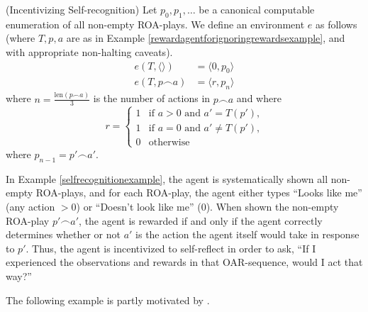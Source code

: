 \documentclass[runningheads]{llncs}
\begin{document}
\begin{example}
\label{selfrecognitionexample}
    (Incentivizing Self-recognition)
    Let $p_0,p_1,\ldots$ be a canonical computable enumeration of all non-empty ROA-plays.
    We define an environment $e$ as follows (where $T,p,a$
    are as in Example \ref{rewardagentforignoringrewardsexample}, and with appropriate
    non-halting caveats).
    \begin{align*}
        e(T,\langle\rangle) &= \langle 0, p_0\rangle\\
        e(T,p\frown a) &= \langle r, p_{n}\rangle
    \end{align*}
    where $n=\frac{\mbox{len}(p\frown a)}{3}$ is the number of actions in $p\frown a$ and where
    \[
        r =
        \begin{cases}
            1 &\mbox{if $a>0$ and $a'=T(p')$,}\\
            1 &\mbox{if $a=0$ and $a'\not=T(p')$,}\\
            0 &\mbox{otherwise}
        \end{cases}
    \]
    where $p_{n-1}=p'\frown a'$.
\end{example}

In Example \ref{selfrecognitionexample}, the agent is systematically
shown all non-empty ROA-plays, and for
each ROA-play, the agent either types ``Looks like me'' (any action $>0$)
or ``Doesn't look like me'' ($0$). When shown the non-empty ROA-play
$p'\frown a'$, the agent is rewarded if and only if the agent
correctly determines whether or not $a'$
is the action the agent itself would take in response to $p'$.
Thus, the agent is incentivized to self-reflect in order to ask, ``If I experienced the
observations and rewards in that OAR-sequence, would I act that way?''

The following example is partly motivated by \cite{yampolskiy2012ai}.
\end{document}
